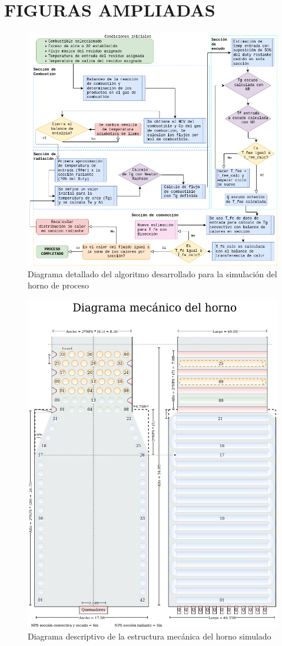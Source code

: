 \chapter{FIGURAS AMPLIADAS}\label{apx:img}

\begin{figure}[ht]
\includegraphics[scale=0.55,angle=0]{images/diagrama-algo}
\caption[Diagrama Algoritmo Ampliado]{Diagrama detallado del algoritmo desarrollado para la simulación del horno de proceso}\label{img:dia-algo-full}
\end{figure}

\begin{figure}[ht]
\includegraphics[scale=0.55,angle=0]{images/diagrama-meca}
\caption[Diagrama Mecánico Ampliado]{Diagrama descriptivo de la estructura mecánica del horno simulado}\label{img:dia-meca-full}
\end{figure}